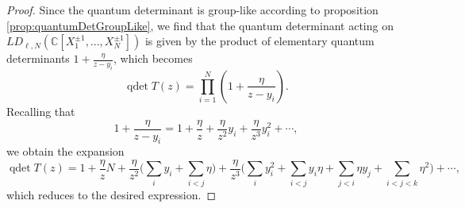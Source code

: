 \documentclass[11pt]{report}
\theoremstyle{definition}
\theoremstyle{remark}
\theoremstyle{remark}
\newcommand{\C}{\mathbb{C}}
\begin{document}
\begin{proof}
Since the quantum determinant is group-like according to proposition \ref{prop:quantumDetGroupLike}, we find that the quantum determinant acting on $LD_{\ell,N}(\C[X_1^{\pm 1},...,X_N^{\pm 1}])$ is given by the product of elementary quantum determinants $1+\frac{\eta}{z-y_i}$, which becomes
\begin{equation*}
\operatorname{qdet} T(z) = \prod_{i=1}^N \left( 1 + \frac{\eta}{z-y_i} \right).
\end{equation*}
Recalling that
\begin{equation*}
1+ \frac{\eta}{z-y_i} = 1 + \frac{\eta}{z} + \frac{\eta}{z^2} y_i + \frac{\eta}{z^3} y_i^2 + \cdots,
\end{equation*}
we obtain the expansion
\begin{equation*}
\operatorname{qdet} T(z) = 1 + \frac{\eta}{z} N + \frac{\eta}{z^2} \bigg( \sum_i y_i + \sum_{i < j} \eta \bigg)
+ \frac{\eta}{z^3} \bigg( \sum_i y_i^2 + \sum_{i < j} y_i \eta + \sum_{j < i} \eta y_j + \sum_{i < j < k} \eta^2 \bigg) + \cdots,
\end{equation*}
which reduces to the desired expression.
%

\end{proof}
\end{document}
